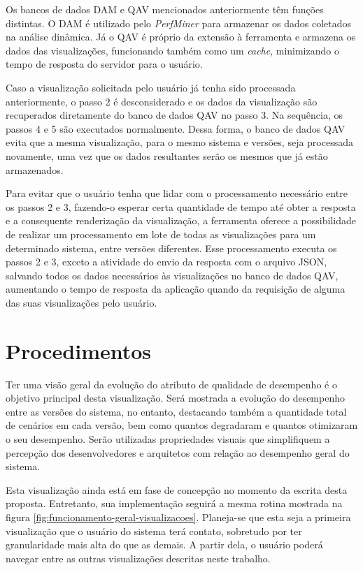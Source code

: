Os bancos de dados DAM e QAV mencionados anteriormente têm funções distintas. O DAM é utilizado pelo \textit{PerfMiner} para armazenar os dados coletados na análise dinâmica. Já o QAV é próprio da extensão à ferramenta e armazena os dados das visualizações, funcionando também como um \textit{cache}, minimizando o tempo de resposta do servidor para o usuário.

Caso a visualização solicitada pelo usuário já tenha sido processada anteriormente, o passo 2 é desconsiderado e os dados da visualização são recuperados diretamente do banco de dados QAV no passo 3. Na sequência, os passos 4 e 5 são executados normalmente. Dessa forma, o banco de dados QAV evita que a mesma visualização, para o mesmo sistema e versões, seja processada novamente, uma vez que os dados resultantes serão os mesmos que já estão armazenados.

Para evitar que o usuário tenha que lidar com o processamento necessário entre os passos 2 e 3, fazendo-o esperar certa quantidade de tempo até obter a resposta e a consequente renderização da visualização, a ferramenta oferece a possibilidade de realizar um processamento em lote de todas as visualizações para um determinado sistema, entre versões diferentes. Esse processamento executa os passos 2 e 3, exceto a atividade do envio da resposta com o arquivo JSON, salvando todos os dados necessários às visualizações no banco de dados QAV, aumentando o tempo de resposta da aplicação quando da requisição de alguma das suas visualizações pelo usuário.

\section{Procedimentos} \label{sec:procedimentos}

Ter uma visão geral da evolução do atributo de qualidade de desempenho é o objetivo principal desta visualização. Será mostrada a evolução do desempenho entre as versões do sistema, no entanto, destacando também a quantidade total de cenários em cada versão, bem como quantos degradaram e quantos otimizaram o seu desempenho. Serão utilizadas propriedades visuais que simplifiquem a percepção dos desenvolvedores e arquitetos com relação ao desempenho geral do sistema.

Esta visualização ainda está em fase de concepção no momento da escrita desta proposta. Entretanto, sua implementação seguirá a mesma rotina mostrada na figura \ref{fig:funcionamento-geral-visualizacoes}. Planeja-se que esta seja a primeira visualização que o usuário do sistema terá contato, sobretudo por ter granularidade mais alta do que as demais. A partir dela, o usuário poderá navegar entre as outras visualizações descritas neste trabalho.

